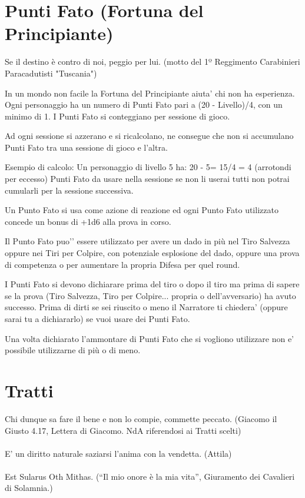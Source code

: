 \documentclass[a4paper,11pt,twoside,openany]{book}
\begin{document}
\section{Punti Fato (Fortuna del Principiante)}
\begin{tcolorbox}[enhanced,arc=5pt,boxrule=0.3pt]{Se il destino è contro di noi, peggio per lui. (motto del 1º Reggimento Carabinieri Paracadutisti "Tuscania")}\end{tcolorbox}\medskip

In un mondo non facile la Fortuna del Principiante aiuta’ chi non ha esperienza.
Ogni personaggio ha un numero di Punti Fato pari a (20 - Livello)/4, con un minimo di 1. I Punti Fato si conteggiano per sessione di gioco.

Ad ogni sessione si azzerano e si ricalcolano, ne consegue che non si accumulano Punti Fato tra una sessione di gioco e l’altra.

Esempio di calcolo:
Un personaggio di livello 5 ha: 20 - 5= 15/4 = 4 (arrotondi per eccesso) Punti Fato da usare nella sessione se non li userai tutti non potrai cumularli per la sessione successiva.

Un Punto Fato si usa come azione di reazione ed ogni Punto Fato utilizzato concede un bonus di +1d6 alla prova in corso.

Il Punto Fato puo'’ essere utilizzato per avere un dado in più nel Tiro Salvezza oppure nei Tiri per Colpire, con potenziale esplosione del dado, oppure una prova di competenza o per aumentare la propria Difesa per quel round.

I Punti Fato si devono dichiarare prima del tiro o dopo il tiro ma prima di sapere se la prova (Tiro Salvezza, Tiro per Colpire... propria o dell’avversario) ha avuto successo.
Prima di dirti se sei riuscito o meno il Narratore ti chiedera’ (oppure sarai tu a dichiararlo) se vuoi usare dei Punti Fato.

Una volta dichiarato l’ammontare di Punti Fato che si vogliono utilizzare non e’ possibile utilizzarne di più o di meno.

\section{Tratti}

\label{tratti}
\begin{tcolorbox}[enhanced,arc=5pt,boxrule=0.3pt]{Chi dunque sa fare il bene e non lo compie, commette peccato. (Giacomo il Giusto 4.17, Lettera di Giacomo. NdA riferendosi ai Tratti scelti)\\\\
E' un diritto naturale saziarsi l'anima con la vendetta. (Attila)\\\\
Est Sularus Oth Mithas. (“Il mio onore è la mia vita”, Giuramento dei Cavalieri di Solamnia.)}\end{tcolorbox}\medskip
\end{document}
